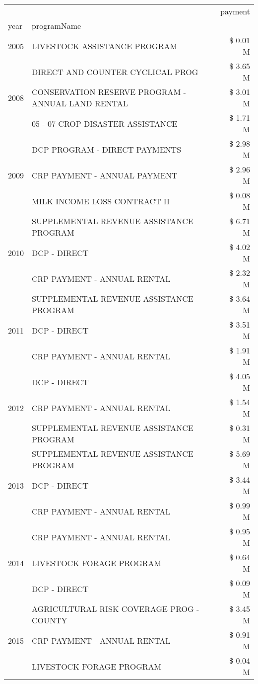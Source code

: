 \begin{tabular}{llr}
\toprule
 &  & payment \\
year & programName &  \\
\midrule
2005 & LIVESTOCK ASSISTANCE PROGRAM & \$ 0.01 M \\
\cline{1-3}
\multirow[t]{3}{*}{2008} & DIRECT AND COUNTER CYCLICAL PROG & \$ 3.65 M \\
 & CONSERVATION RESERVE PROGRAM - ANNUAL LAND RENTAL & \$ 3.01 M \\
 & 05 - 07 CROP DISASTER ASSISTANCE & \$ 1.71 M \\
\cline{1-3}
\multirow[t]{3}{*}{2009} & DCP PROGRAM - DIRECT PAYMENTS & \$ 2.98 M \\
 & CRP PAYMENT - ANNUAL PAYMENT & \$ 2.96 M \\
 & MILK INCOME LOSS CONTRACT II & \$ 0.08 M \\
\cline{1-3}
\multirow[t]{3}{*}{2010} & SUPPLEMENTAL REVENUE ASSISTANCE PROGRAM & \$ 6.71 M \\
 & DCP - DIRECT & \$ 4.02 M \\
 & CRP PAYMENT - ANNUAL RENTAL & \$ 2.32 M \\
\cline{1-3}
\multirow[t]{3}{*}{2011} & SUPPLEMENTAL REVENUE ASSISTANCE PROGRAM & \$ 3.64 M \\
 & DCP - DIRECT & \$ 3.51 M \\
 & CRP PAYMENT - ANNUAL RENTAL & \$ 1.91 M \\
\cline{1-3}
\multirow[t]{3}{*}{2012} & DCP - DIRECT & \$ 4.05 M \\
 & CRP PAYMENT - ANNUAL RENTAL & \$ 1.54 M \\
 & SUPPLEMENTAL REVENUE ASSISTANCE PROGRAM & \$ 0.31 M \\
\cline{1-3}
\multirow[t]{3}{*}{2013} & SUPPLEMENTAL REVENUE ASSISTANCE PROGRAM & \$ 5.69 M \\
 & DCP - DIRECT & \$ 3.44 M \\
 & CRP PAYMENT - ANNUAL RENTAL & \$ 0.99 M \\
\cline{1-3}
\multirow[t]{3}{*}{2014} & CRP PAYMENT - ANNUAL RENTAL & \$ 0.95 M \\
 & LIVESTOCK FORAGE PROGRAM & \$ 0.64 M \\
 & DCP - DIRECT & \$ 0.09 M \\
\cline{1-3}
\multirow[t]{3}{*}{2015} & AGRICULTURAL RISK COVERAGE PROG - COUNTY & \$ 3.45 M \\
 & CRP PAYMENT - ANNUAL RENTAL & \$ 0.91 M \\
 & LIVESTOCK FORAGE PROGRAM & \$ 0.04 M \\

\end{tabular}
